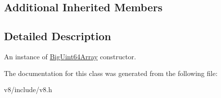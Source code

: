 \subsection*{Additional Inherited Members}


\subsection{Detailed Description}
An instance of \mbox{\hyperlink{classv8_1_1BigUint64Array}{Big\+Uint64\+Array}} constructor. 

The documentation for this class was generated from the following file\+:\begin{DoxyCompactItemize}
\item 
v8/include/v8.\+h\end{DoxyCompactItemize}
